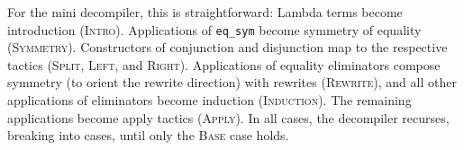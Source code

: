 \iffalse
\begin{figure*}
\begin{minipage}{0.48\textwidth}
\begin{lstlisting}
fun (@\codesimb{(y0 : list A)}@) =>(@\vspace{-0.04cm}@)
  (@\codesima{list\_rect}@) _ _  (fun (@\codesima{a l H}@) =>(@\vspace{-0.04cm}@)
    (@\codesimc{eq\_ind\_r}@) _ (@\codesimd{eq\_refl}@) (@\codesimc{(app\_nil\_r (rev l) (a::[]))}@))(@\vspace{-0.04cm}@)
    (@\codesime{eq\_refl}@)(@\vspace{-0.04cm}@)
    (@\codesima{y0}@)(@\vspace{-0.04cm}@)
\end{lstlisting}
\end{minipage}
\begin{minipage}{0.48\textwidth}
\begin{lstlisting}
(@\vspace{-0.14cm}@)
- (@\codesimb{intro y0.}@) (@\codesima{induction y0 as [a l H|].}@)(@\vspace{-0.04cm}@)
  + (@\codesimc{simpl. rewrite app\_nil\_r.}@) (@\codesimd{auto.}@)(@\vspace{-0.04cm}@)
  + (@\codesime{auto.}@)(@\vspace{-0.04cm}@)
(@\vspace{-0.14cm}@)
\end{lstlisting}
\end{minipage}
\vspace{-0.3cm}
\caption{Proof term (left) and decompiled proof script (right) for the base case of 
\lstinline{rev_app_distr} (Section~\ref{sec:overview}),  with corresponding terms and tactics 
grouped by color and number.}
\label{fig:rainbow}
\end{figure*}
\fi

For the mini decompiler, this is straightforward: Lambda terms become introduction (\textsc{Intro}).
Applications of \lstinline{eq_sym} become symmetry of equality (\textsc{Symmetry}).
Constructors of conjunction and disjunction map to the respective tactics (\textsc{Split}, \textsc{Left}, and \textsc{Right}).
Applications of equality eliminators compose symmetry (to orient the rewrite direction) with rewrites (\textsc{Rewrite}),
and all other applications of eliminators become induction (\textsc{Induction}).
The remaining applications become apply tactics (\textsc{Apply}).
In all cases, the decompiler recurses, breaking into cases, until only the \textsc{Base}
case holds. %

